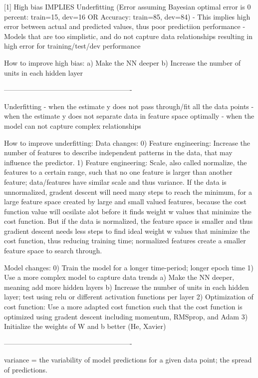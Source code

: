 \documentclass[11pt, onecolumn]{article}
\begin{document}
[1] High bias IMPLIES Underfitting (Error assuming Bayesian optimal error is 0 percent: train=15, dev=16 OR Accuracy: train=85, dev=84)
	- This implies high error between actual and predicted values, thus poor predictiion performance
	- Models that are too simplistic, and do not capture data relationships resulting in high error for training/test/dev performance 


How to improve high bias:
a) Make the NN deeper
b) Increase the number of units in each hidden layer

-------------------------------------------------------

Underfitting
	- when the estimate y does not pass through/fit all the data points
	- when the estimate y does not separate data in feature space optimally
	- when the model can not capture complex relationships

How to improve underfitting:
Data changes:
0) Feature engineering: Increase the number of features to describe independent patterns in the data, that may influence the predictor.
1) Feature engineering: Scale, also called normalize, the features to a certain range, such that no one feature is larger than another feature; data/features have similar scale and thus variance. If the data is unnormalized, gradent descent will need many steps to reach the minimum, for a large feature space created by large and small valued features, because the cost function value will ocsilate alot before it finds weight w values that minimize the cost function.  But if the data is normalized, the feature space is smaller and thus gradient descent needs less steps to find ideal weight w values that minimize the cost function, thus reducing training time; normalized features create a smaller feature space to search through.

Model changes:
0) Train the model for a longer time-period; longer epoch time
1) Use a more complex model to capture data trends
	a) Make the NN deeper, meaning add more hidden layers
	b) Increase the number of units in each hidden layer; test using relu or different activation functions per layer
2) Optimization of cost function: Use a more adapted cost function such that the cost function is optimized using gradent descent including momentum, RMSprop, and Adam
3) Initialize the weights of W and b better (He, Xavier)

-------------------------------------------------------

variance = the variability of model predictions for a given data point; the spread of predictions. 
\end{document}

